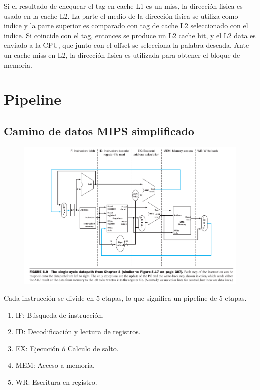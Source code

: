\documentclass{article}
\begin{document}
Si el resultado de chequear el tag en cache L1 es un miss, la dirección fisica es usado en la cache L2. La parte el medio de la dirección fisica se utiliza como indice y la parte superior es comparado con tag de cache L2 seleccionado con el indice. Si coincide con el tag, entonces se produce un L2 cache hit, y el L2 data es enviado a la CPU, que junto con el offset se selecciona la palabra deseada.
Ante un cache miss en L2, la dirección fisica es utilizada para obtener el bloque de memoria.

\newpage
\section{Pipeline}

\subsection{Camino de datos MIPS simplificado}

\begin{figure}[h!]
    \includegraphics[width=\linewidth]{imagenes/pipeline/simple-datapath.png}
\end{figure}

Cada instrucción se divide en 5 etapas, lo que significa un pipeline de 5 etapas. 

\begin{enumerate}
    \item IF: Búsqueda de instrucción.
    \item ID: Decodificación y lectura de registros.
    \item EX: Ejecución ó Calculo de salto.
    \item MEM: Acceso a memoria.
    \item WR: Escritura en registro.
\end{enumerate}
\end{document}
